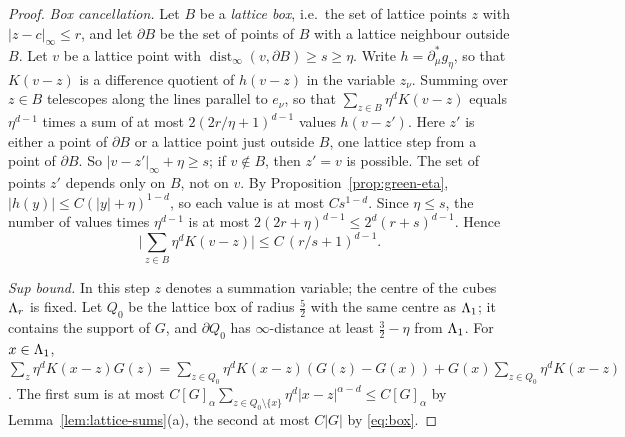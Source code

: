 \begin{proof}
\emph{Box cancellation.} Let $B$ be a \emph{lattice box}, i.e.\ the set of lattice points $z$ with $|z-c|_\infty\le r$, and let $\partial B$ be the set of points of $B$ with a lattice neighbour outside $B$. Let $v$ be a lattice point with $\operatorname{dist}_\infty(v,\partial B)\ge s\ge\eta$. Write $h=\partial^*_\mu g_\eta$, so that $K(v-z)$ is a difference quotient of $h(v-z)$ in the variable $z_\nu$. Summing over $z\in B$ telescopes along the lines parallel to $e_\nu$, so that $\sum_{z\in B}\eta^dK(v-z)$ equals $\eta^{d-1}$ times a sum of at most $2(2r/\eta+1)^{d-1}$ values $h(v-z')$. Here $z'$ is either a point of $\partial B$ or a lattice point just outside $B$, one lattice step from a point of $\partial B$. So $|v-z'|_\infty+\eta\ge s$; if $v\notin B$, then $z'=v$ is possible. The set of points $z'$ depends only on $B$, not on $v$. By Proposition~\ref{prop:green-eta}, $|h(y)|\le C(|y|+\eta)^{1-d}$, so each value is at most $Cs^{1-d}$. Since $\eta\le s$, the number of values times $\eta^{d-1}$ is at most $2(2r+\eta)^{d-1}\le2^d(r+s)^{d-1}$. Hence
\begin{equation}\label{eq:box}
\Big|\sum_{z\in B}\eta^dK(v-z)\Big|\le C\,(r/s+1)^{d-1}.
\end{equation}

\emph{Sup bound.} In this step $z$ denotes a summation variable; the centre of the cubes $\Lambda_r$ is fixed. Let $Q_0$ be the lattice box of radius $\frac52$ with the same centre as $\Lambda_1$; it contains the support of $G$, and $\partial Q_0$ has $\infty$-distance at least $\frac32-\eta$ from $\Lambda_1$. For $x\in\Lambda_1$, $\sum_z\eta^dK(x-z)G(z)=\sum_{z\in Q_0}\eta^dK(x-z)(G(z)-G(x))+G(x)\sum_{z\in Q_0}\eta^dK(x-z)$. The first sum is at most $C[G]_\alpha\sum_{z\in Q_0\setminus\{x\}}\eta^d|x-z|^{\alpha-d}\le C[G]_\alpha$ by Lemma~\ref{lem:lattice-sums}(a), the second at most $C|G|$ by \eqref{eq:box}.


\end{proof}
